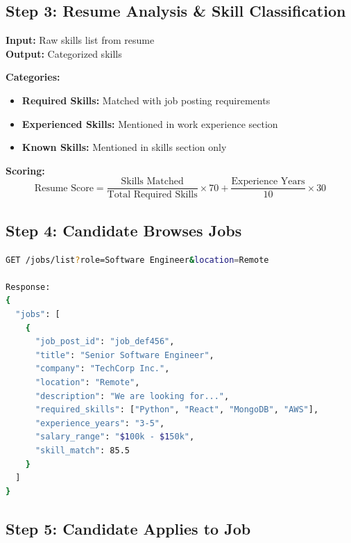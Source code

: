 \documentclass[12pt,a4paper]{article}
\begin{document}
\newpage

\subsection{Step 3: Resume Analysis \& Skill Classification}

\begin{tcolorbox}[colback=successgreen!5,colframe=successgreen,title=\textbf{Skill Classification Algorithm}]
\textbf{Input:} Raw skills list from resume \\
\textbf{Output:} Categorized skills

\textbf{Categories:}
\begin{itemize}
    \item \textbf{Required Skills:} Matched with job posting requirements
    \item \textbf{Experienced Skills:} Mentioned in work experience section
    \item \textbf{Known Skills:} Mentioned in skills section only
\end{itemize}

\textbf{Scoring:}
\begin{equation}
\text{Resume Score} = \frac{\text{Skills Matched}}{\text{Total Required Skills}} \times 70 + \frac{\text{Experience Years}}{10} \times 30
\end{equation}
\end{tcolorbox}

\subsection{Step 4: Candidate Browses Jobs}

\begin{lstlisting}[language=bash, caption=Job Listings API]
GET /jobs/list?role=Software Engineer&location=Remote

Response:
{
  "jobs": [
    {
      "job_post_id": "job_def456",
      "title": "Senior Software Engineer",
      "company": "TechCorp Inc.",
      "location": "Remote",
      "description": "We are looking for...",
      "required_skills": ["Python", "React", "MongoDB", "AWS"],
      "experience_years": "3-5",
      "salary_range": "$100k - $150k",
      "skill_match": 85.5
    }
  ]
}
\end{lstlisting}

\subsection{Step 5: Candidate Applies to Job}
\end{document}
